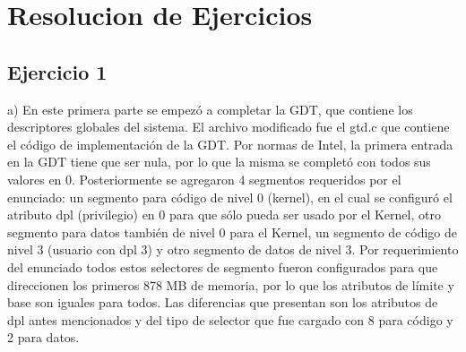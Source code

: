 \documentclass[a4paper]{article}
\begin{document}
\thispagestyle{empty}
\maketitle





\thispagestyle{empty}
\vspace{3cm}
\tableofcontents
\newpage


\newpage



\section{Resolucion de Ejercicios}
\subsection{Ejercicio 1}

a) En este primera parte se empezó a completar la GDT, que contiene los descriptores globales del sistema. El archivo modificado fue el gtd.c que contiene el código de implementación de la GDT. Por normas de Intel, la primera entrada en la GDT tiene que ser nula, por lo que la misma se completó con todos sus valores en 0. Posteriormente se agregaron 4 segmentos requeridos por el enunciado: un segmento para código de nivel 0 (kernel), en el cual se configuró el atributo dpl (privilegio) en 0 para que sólo pueda ser usado por el Kernel, otro segmento para datos también de nivel 0 para el Kernel, un segmento de código de nivel 3 (usuario con dpl 3) y otro segmento de datos de nivel 3. Por requerimiento del enunciado todos estos selectores de segmento fueron configurados para que direccionen los primeros 878 MB de memoria, por lo que los atributos de límite y base son iguales para todos. Las diferencias que presentan son los atributos de dpl antes mencionados y del tipo de selector que fue cargado con 8 para código y 2 para datos.
\end{document}
